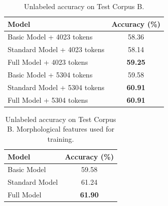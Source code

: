\documentclass[11pt,letterpaper]{article}
\begin{document}
\begin{table}
\begin{center}
  \begin{tabular}{ l || c }
  \hline
  Model & Accuracy (\%)\\
  \hline
  Basic Model + 4023 tokens & 58.36 \\
  Standard Model + 4023 tokens & 58.14 \\
  Full Model + 4023 tokens & \textbf{59.25} \\
  Basic Model + 5304 tokens & 59.58 \\
  Standard Model + 5304 tokens & \textbf{60.91} \\
  Full Model + 5304 tokens & \textbf{60.91}\\
  \hline
   \end{tabular}
\end{center}
\caption{Unlabeled accuracy on Test Corpus B.}
\label{Four}
\end{table}

\begin{table}
\begin{center}
  \begin{tabular}{ l || c }
  \hline
  Model & Accuracy (\%)\\
  \hline
  Basic Model & 59.58 \\
  Standard Model & 61.24 \\
  Full Model & \textbf{61.90} \\
  \hline
   \end{tabular}
\end{center}
\caption{Unlabeled accuracy on Test Corpus B. Morphological features used for training.}
\label{Five}
\end{table}














 

\newpage




\label{lastpage}
\end{document}
